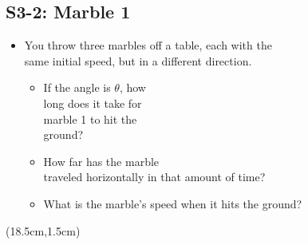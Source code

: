 \documentclass[]{article}
\begin{document}
\begin{PresentSpace}
\vspace{-10pt}
\section*{S3-2: Marble 1}
\vspace{-10pt}
\begin{itemize}
	\item You throw three marbles off a table, each with the \\
	same initial speed, but in a different direction.
	\vspace{10pt}
	\begin{itemize}
		\item If the angle is $\theta$, how \\
		long does it take for \\
		marble 1 to hit the \\
		ground?
		\item How far has the marble \\
		traveled horizontally in that amount of time?
		\item What is the marble's speed when it hits the ground?
	\end{itemize}
\end{itemize}
\end{PresentSpace}
\begin{textblock*}{10cm}(18.5cm,1.5cm)
	\Large
\end{textblock*}
\newpage
\end{document}
